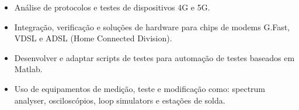 \documentclass[10pt,a4paper,ragged2e]{altacv}
\begin{document}
\tagline{}

\begin{fullwidth}
\makecvheader
\end{fullwidth}



\begin{itemize}
\item Análise de protocolos e testes de dispositivos 4G e 5G.
\end{itemize}

\divider

\begin{itemize}
\item Integração, verificação e soluções de hardware para chips de modems G.Fast, VDSL e ADSL (Home Connected Division).
\item Desenvolver e adaptar scripts de testes para automação de testes baseados em Matlab.
\item Uso de equipamentos de medição, teste e modificação como: spectrum analyser, osciloscópios, loop simulators e estações de solda.
\end{itemize}

\end{document}
